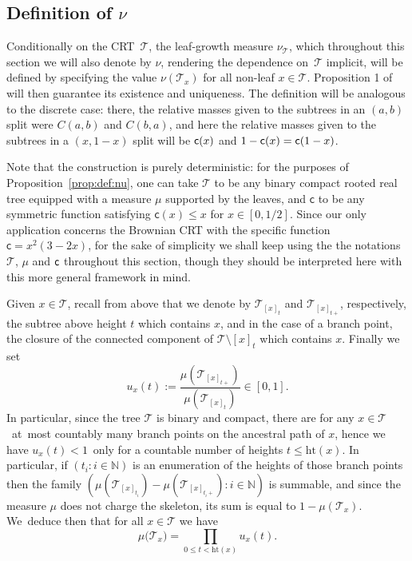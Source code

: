 \documentclass[11pt]{article}
\newcommand{\T}{\mathcal{T}}\let\CRT\T\let\tbr\T
\newcommand{\h}{\mathrm{ht}}
\theoremstyle{definition}
\begin{document}
\subsection{Definition of $\nu$}
Conditionally on the CRT~$\mathcal{T}$, the leaf-growth measure $\nu_{\mathcal{T}}$, which throughout this section we will also denote by $\nu$, rendering the dependence on~$\mathcal{T}$ implicit, will be defined by specifying the value $\nu(\T_x)$ for all non-leaf $x\in\T$. Proposition 1 of \cite{Steph13} will then guarantee its existence and uniqueness. The definition will be analogous to the discrete case: there, the relative masses given to the subtrees in an $(a,b)$ split were $C(a,b)$ and $C(b,a)$, and here the relative masses given to the subtrees in a $(x,1-x)$ split will be $\mathsf{c}(x)$ and $1-\mathsf{c}(x)=\mathsf{c}(1-x)$.

Note that the construction is purely deterministic: for the purposes of Proposition~\ref{prop:def:nu}, one can take $\T$ to be any binary compact rooted real tree equipped with a measure $\mu$ supported by the leaves, and $ \mathsf{c}$ to be any symmetric function satisfying $ \mathsf{c}(x) \leq x$ for $x \in [0,1/2]$. Since our only application concerns the Brownian CRT with the specific function $\mathsf{c}=x^2(3-2x)$, for the sake of simplicity we shall keep using the the notations $\mathcal{T}$, $\mu$ and $\mathsf{c}$ throughout this section, though they should be interpreted here with this more general framework in mind.

Given $x \in \T$, recall from above that we denote by $ \mathcal{T}_{[x]_t}$ and $\mathcal{T}_{[x]_{t+}}$, respectively, the subtree above height $t$ which contains $x$, and in the case of a branch point, the closure of the connected component of $\T\setminus{[x]_t}$ which contains $x$. Finally we set
\[
u_x(t) := \frac{\mu(\T_{[x]_{t+}})}{ \mu(\T_{[x]_t})} \in [0,1].
\]
In particular, since the tree $ \mathcal{T}$ is binary and compact, there are for any \hbox{$x \in \T$}~at~most countably many branch points on the ancestral path of $x$, hence we have \hbox{$u_x(t) < 1$}~only for a countable number of heights $t \leq \h(x)$. In particular, if $(t_i : i \in \mathbb{N})$ is an enumeration of the heights of those branch points then the family \hbox{$ (\mu(\mathcal{T}_{[x]_{t_i}})-\mu(\mathcal{T}_{[x]_{t_i +}}): i \in \mathbb{N})$} is summable, and since the measure $\mu$ does not charge the skeleton, its sum is equal to $1- \mu(\mathcal{T}_x)$. We~deduce then that for all $x \in \T$ we have
\begin{equation} \mu\big(\T_x\big) = \prod_{0 \leq t < \h(x)} u_x(t). \label{eq:noloss}\end{equation}
\end{document}
